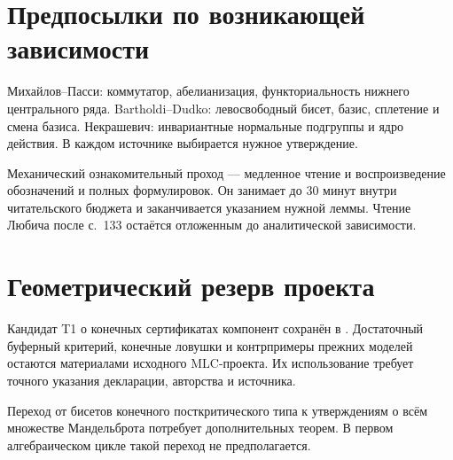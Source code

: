 \section{Предпосылки по возникающей зависимости}
Михайлов--Пасси: коммутатор, абелианизация, функториальность нижнего
центрального ряда. Bartholdi--Dudko: левосвободный бисет, базис,
сплетение и смена базиса. Некрашевич: инвариантные нормальные подгруппы
и ядро действия. В каждом источнике выбирается нужное утверждение.

Механический ознакомительный проход --- медленное чтение и воспроизведение
обозначений и полных формулировок. Он занимает до 30 минут внутри
читательского бюджета и заканчивается указанием нужной леммы.
Чтение Любича после с.~133 остаётся отложенным до аналитической зависимости.

\section{Геометрический резерв проекта}
Кандидат T1 о конечных сертификатах компонент сохранён в
. Достаточный буферный критерий,
конечные ловушки и контрпримеры прежних моделей остаются материалами
исходного MLC-проекта. Их использование требует точного указания
декларации, авторства и источника.

Переход от бисетов конечного посткритического типа к утверждениям
о всём множестве Мандельброта потребует дополнительных теорем.
В первом алгебраическом цикле такой переход не предполагается.
